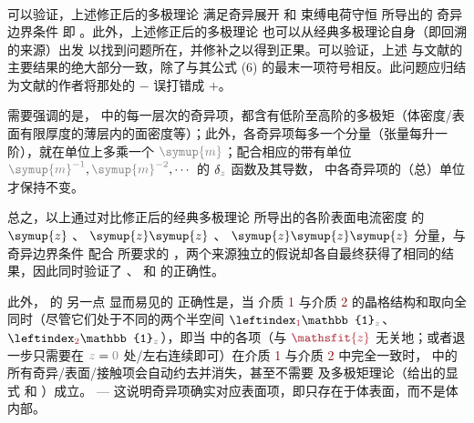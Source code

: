 \begin{subequations}
\begin{align}
\end{align}
\end{subequations}
可以验证，上述修正后的多极理论  满足奇异展开  和 束缚电荷守恒  所导出的 奇异边界条件  即 。此外，上述修正后的多极理论  也可以从经典多极理论自身（即回溯  的来源）出发\cite{raabMultipoleTheoryElectromagnetism2004,delangeElectromagneticBoundaryConditions2013} 以找到问题所在，并修补之以得到正果。可以验证，上述  与文献\cite{delangeElectromagneticBoundaryConditions2013}的主要结果的绝大部分一致，除了与其公式 (6) 的最末一项符号相反。此问题应归结为文献\cite{delangeElectromagneticBoundaryConditions2013}的作者将那处的 $-$ 误打错成 $+$。

需要强调的是， 中的每一层次的奇异项，都含有低阶至高阶的多极矩（体密度/表面有限厚度的薄层内的面密度等）；此外，各奇异项每多一个分量（张量每升一阶），就在单位上多乘一个 $\mathcolor{gray}{\symup{m}}$；配合相应的带有单位 $\mathcolor{gray}{\symup{m}^{-1}},\mathcolor{gray}{\symup{m}^{-2}},\cdots$ 的 $\delta_{\mathcolor{gray}{z}}$ 函数及其导数， 中各奇异项的（总）单位才保持不变。

总之，以上通过对比修正后的经典多极理论  所导出的各阶表面电流密度  的 $\symup{z}$ 、 $\symup{z} \symup{z}$ 、 $\symup{z} \symup{z} \symup{z}$ 分量，与奇异边界条件  配合  所要求的 ，两个来源独立的假说却各自最终获得了相同的结果，因此同时验证了  、  和  的正确性。

此外， 的 另一点 显而易见的 正确性是，当 介质 \textcolor{Maroon}{1} 与介质 \textcolor{Maroon}{2} 的晶格结构和取向全同时（尽管它们处于不同的两个半空间 $\leftindex_{\textcolor{Maroon}{1}} {\mathbb{1}}_{\mathcolor{gray}{z}}$、$\leftindex_{\textcolor{Maroon}{2}} {\mathbb{1}}_{\mathcolor{gray}{z}}$），即当  中的各项（与 $\textcolor{Maroon}{\mathsfit{z}}$ 无关地；或者退一步只需要在 $\mathcolor{gray}{z \mathcolor{black}{=} 0}$ 处/左右连续即可）在介质 \textcolor{Maroon}{1} 与介质 \textcolor{Maroon}{2} 中完全一致时， 中的所有奇异/表面/接触项会自动约去并消失，甚至不需要  及多极矩理论（给出的显式  和 ）成立。 ---  这说明奇异项确实对应表面项，即只存在于体表面，而不是体内部。


